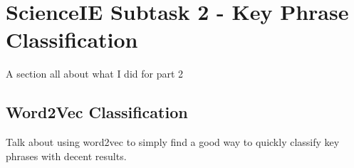 \section{ScienceIE Subtask 2 - Key Phrase Classification}
A section all about what I did for part 2
\subsection{Word2Vec Classification}
Talk about using word2vec to simply find a good way to quickly classify key phrases with decent results.
